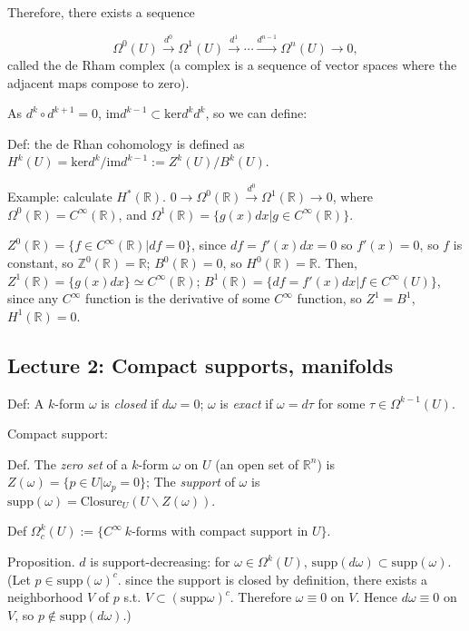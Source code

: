 \documentclass{article}
\theoremstyle{mystyle}
\theoremstyle{remark}
\numberwithin{equation}{section}
\begin{document}
Therefore, there exists a sequence

$$\Omega^0(U)\xrightarrow{d^0}\Omega^1(U)\xrightarrow{d^1}\cdots \xrightarrow{d^{n-1}} \Omega^n(U)\rightarrow 0,$$
called the de Rham complex (a complex is a sequence of vector spaces where the adjacent maps compose to zero).

As $d^k\circ d^{k+1}=0$, $\mathrm{im} d^{k-1}\subset \mathrm{ker} d^k d^k$, so we can define:

Def: the de Rhan cohomology is defined as $H^k(U) = \mathrm{ker}d^k/\mathrm{im} d^{k-1}:= Z^k(U)/B^k(U)$. 

Example: calculate $H^*(\mathbb{R})$. $0\rightarrow \Omega^0(\mathbb{R})\xrightarrow {d^0}\Omega^1(\mathbb{R})\rightarrow 0$, where $\Omega^0(\mathbb{R}) = C^\infty(\mathbb{R})$, and $\Omega^1(\mathbb{R}) = \{g(x)dx|g\in C^\infty(\mathbb{R})\}$. 

$Z^0(\mathbb{R}) = \{f \in C^\infty(\mathbb{R})|df=0\}$, since $df=f'(x)dx=0$ so $f'(x)=0$, so $f$ is constant, so $\mathbb{Z}^0(\mathbb{R}) = \mathbb{R}$; $B^0(\mathbb{R})=0$, so $H^0(\mathbb{R}) = \mathbb{R}$. Then, $Z^1(\mathbb{R}) = \{g(x)dx\} \simeq C^\infty(\mathbb{R})$; $B^1(\mathbb{R}) = \{df=f'(x)dx|f\in C^\infty(U)\}$, since any $C^\infty$ function is the derivative of some $C^\infty$ function, so $Z^1=B^1$, $H^1(\mathbb{R})=0$. 


\subsection{Lecture 2: Compact supports, manifolds}

Def: A $k$-form $\omega$ is \emph{closed} if $d\omega=0$; $\omega$ is \emph{exact} if $\omega = d\tau$ for some $\tau\in \Omega^{k-1}(U)$. 

Compact support:

Def. The \emph{zero set} of a $k$-form $\omega$ on $U$ (an open set of $\mathbb{R}^n$) is $Z(\omega) =\{p\in U|\omega_p = 0\}$; The \emph{support} of $\omega$ is $\mathrm{supp}(\omega) = \text{Closure}_U(U\backslash Z(\omega))$. 

Def $\Omega^k_c(U) := \{C^\infty~k \text{-forms with compact support in }U\}$. 

Proposition. $d$ is support-decreasing: for $\omega \in \Omega^k(U)$, $\mathrm{supp}(d\omega)\subset \mathrm{supp}(\omega)$. (Let $p\in \text{supp}(\omega)^c$. since the support is closed by definition, there exists a neighborhood $V$ of $p$ s.t. $V \subset (\text{supp}\omega)^c$. Therefore $\omega \equiv 0$ on $V$. Hence $d\omega \equiv 0$ on $V$, so $p \notin \text{supp}(d\omega)$.)
\end{document}

